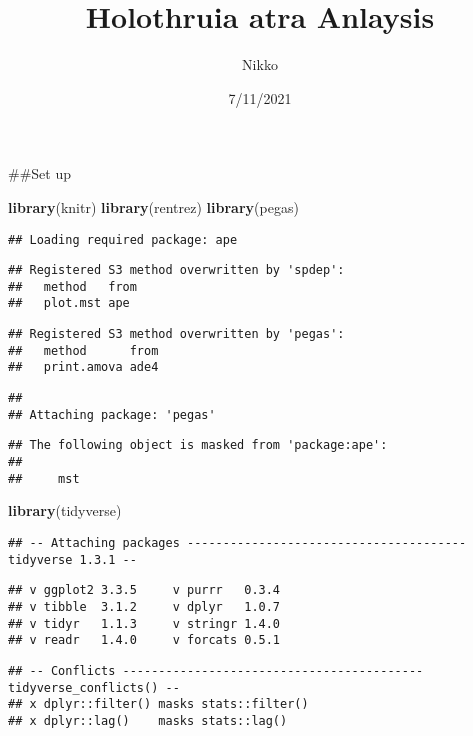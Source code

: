\documentclass[
]{article}
\title{Holothruia atra Anlaysis}
\author{Nikko}
\date{7/11/2021}
\newenvironment{Shaded}{\begin{snugshade}}{\end{snugshade}}
\newcommand{\KeywordTok}[1]{\textcolor[rgb]{0.13,0.29,0.53}{\textbf{#1}}}
\newcommand{\NormalTok}[1]{#1}
\begin{document}
\maketitle

\#\#Set up

\begin{Shaded}
\begin{Highlighting}[]
\KeywordTok{library}\NormalTok{(knitr)}
\KeywordTok{library}\NormalTok{(rentrez)}
\KeywordTok{library}\NormalTok{(pegas)}
\end{Highlighting}
\end{Shaded}

\begin{verbatim}
## Loading required package: ape
\end{verbatim}

\begin{verbatim}
## Registered S3 method overwritten by 'spdep':
##   method   from
##   plot.mst ape
\end{verbatim}

\begin{verbatim}
## Registered S3 method overwritten by 'pegas':
##   method      from
##   print.amova ade4
\end{verbatim}

\begin{verbatim}
## 
## Attaching package: 'pegas'
\end{verbatim}

\begin{verbatim}
## The following object is masked from 'package:ape':
## 
##     mst
\end{verbatim}

\begin{Shaded}
\begin{Highlighting}[]
\KeywordTok{library}\NormalTok{(tidyverse)}
\end{Highlighting}
\end{Shaded}

\begin{verbatim}
## -- Attaching packages --------------------------------------- tidyverse 1.3.1 --
\end{verbatim}

\begin{verbatim}
## v ggplot2 3.3.5     v purrr   0.3.4
## v tibble  3.1.2     v dplyr   1.0.7
## v tidyr   1.1.3     v stringr 1.4.0
## v readr   1.4.0     v forcats 0.5.1
\end{verbatim}

\begin{verbatim}
## -- Conflicts ------------------------------------------ tidyverse_conflicts() --
## x dplyr::filter() masks stats::filter()
## x dplyr::lag()    masks stats::lag()
\end{verbatim}
\end{document}
